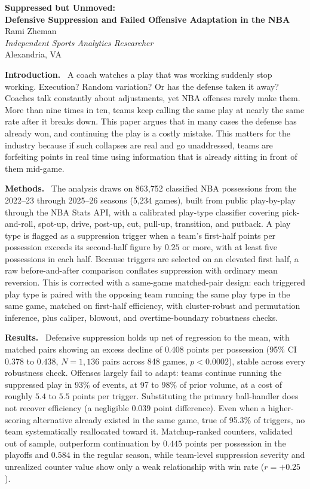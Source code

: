 \documentclass[11pt,letterpaper]{article}
\newcommand{\abssection}[1]{\textbf{#1.}~}
\begin{document}
\begin{center}
{\LARGE\bfseries Suppressed but Unmoved:}\\[0.35em]
{\large\bfseries Defensive Suppression and Failed Offensive Adaptation in the NBA}\\[1em]
{\large Rami Zheman}\\[0.25em]
{\normalsize\textit{Independent Sports Analytics Researcher}\\
Alexandria, VA}
\end{center}

\vspace{0.6em}

\abssection{Introduction}
A coach watches a play that was working suddenly stop working.
Execution? Random variation? Or has the defense taken it away?
Coaches talk constantly about adjustments, yet NBA offenses rarely
make them. More than nine times in ten, teams keep calling the same
play at nearly the same rate after it breaks down. This paper argues
that in many cases the defense has already won, and continuing the
play is a costly mistake. This matters for the industry because if
such collapses are real and go unaddressed, teams are forfeiting
points in real time using information that is already sitting in
front of them mid-game.

\abssection{Methods}
The analysis draws on 863{,}752 classified NBA possessions from the
2022--23 through 2025--26 seasons (5{,}234 games), built from public
play-by-play through the NBA Stats API, with a calibrated play-type
classifier covering pick-and-roll, spot-up, drive, post-up, cut,
pull-up, transition, and putback. A play type is flagged as a
suppression trigger when a team's first-half points per possession
exceeds its second-half figure by $0.25$ or more, with at least five
possessions in each half. Because triggers are selected on an elevated
first half, a raw before-and-after comparison conflates suppression
with ordinary mean reversion. This is corrected with a same-game
matched-pair design: each triggered play type is paired with the
opposing team running the same play type in the same game, matched on
first-half efficiency, with cluster-robust and permutation inference,
plus caliper, blowout, and overtime-boundary robustness checks.

\abssection{Results}
Defensive suppression holds up net of regression to the mean, with
matched pairs showing an excess decline of $0.408$ points per
possession (95\% CI $0.378$ to $0.438$, $N = 1{,}136$ pairs across
848 games, $p < 0.0002$), stable across every robustness check.
Offenses largely fail to adapt: teams continue running the suppressed
play in 93\% of events, at 97 to 98\% of prior volume, at a cost of
roughly $5.4$ to $5.5$ points per trigger. Substituting the primary
ball-handler does not recover efficiency (a negligible $0.039$ point
difference). Even when a higher-scoring alternative already existed in
the same game, true of 95.3\% of triggers, no team systematically
reallocated toward it. Matchup-ranked counters, validated out of
sample, outperform continuation by $0.445$ points per possession in
the playoffs and $0.584$ in the regular season, while team-level
suppression severity and unrealized counter value show only a weak
relationship with win rate ($r = +0.25$).
\end{document}
